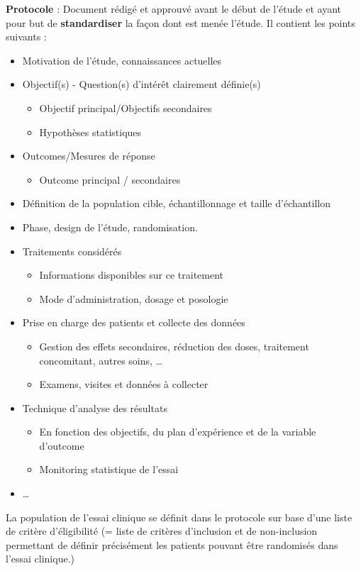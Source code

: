 \textbf{Protocole} : Document rédigé et approuvé avant le début de l’étude et ayant pour but de \textbf{standardiser} la façon dont est menée l’étude. Il contient les points suivants :
\begin{itemize}
    \item Motivation de l’étude, connaissances actuelles
\item Objectif(s) - Question(s) d’intérêt clairement définie(s)
 \begin{itemize}
     \item Objectif principal/Objectifs secondaires
     \item Hypothèses statistiques
 \end{itemize}
\item Outcomes/Mesures de réponse
\begin{itemize}
    \item Outcome principal / secondaires
\end{itemize}
\item Définition de la population cible, échantillonnage et taille d’échantillon
\item Phase, design de l’étude, randomisation.
\item Traitements considérés
\begin{itemize}
    \item Informations disponibles sur ce traitement
    \item Mode d’administration, dosage et posologie
\end{itemize}

\item Prise en charge des patients et collecte des
données
\begin{itemize}
    \item Gestion des effets secondaires, réduction des
doses, traitement concomitant, autres soins, …
\item Examens, visites et données à collecter 
\end{itemize}
\item Technique d’analyse des résultats
\begin{itemize}
    \item En fonction des objectifs, du plan d’expérience et
de la variable d’outcome
\item Monitoring statistique de l’essai
\end{itemize}
\item …
\end{itemize}
\vspace{0.15cm}
La population de l'essai clinique se définit dans le protocole sur base d’une liste de critère d’éligibilité (= liste de critères d’inclusion et de non-inclusion permettant de
définir précisément les patients pouvant être randomisés dans
l’essai clinique.)

